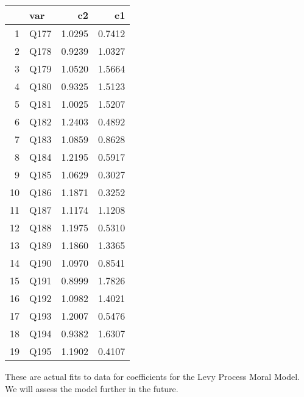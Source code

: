 \documentclass{amsart}
\begin{document}
\begin{table}[ht]
\centering
\begin{tabular}{rlrr}
  \hline
 & var & c2 & c1 \\ 
  \hline
1 & Q177 & 1.0295 & 0.7412 \\ 
  2 & Q178 & 0.9239 & 1.0327 \\ 
  3 & Q179 & 1.0520 & 1.5664 \\ 
  4 & Q180 & 0.9325 & 1.5123 \\ 
  5 & Q181 & 1.0025 & 1.5207 \\ 
  6 & Q182 & 1.2403 & 0.4892 \\ 
  7 & Q183 & 1.0859 & 0.8628 \\ 
  8 & Q184 & 1.2195 & 0.5917 \\ 
  9 & Q185 & 1.0629 & 0.3027 \\ 
  10 & Q186 & 1.1871 & 0.3252 \\ 
  11 & Q187 & 1.1174 & 1.1208 \\ 
  12 & Q188 & 1.1975 & 0.5310 \\ 
  13 & Q189 & 1.1860 & 1.3365 \\ 
  14 & Q190 & 1.0970 & 0.8541 \\ 
  15 & Q191 & 0.8999 & 1.7826 \\ 
  16 & Q192 & 1.0982 & 1.4021 \\ 
  17 & Q193 & 1.2007 & 0.5476 \\ 
  18 & Q194 & 0.9382 & 1.6307 \\ 
  19 & Q195 & 1.1902 & 0.4107 \\ 
   \hline
\end{tabular}
\end{table}

These are actual fits to data for coefficients for the Levy Process Moral Model.  We will assess the model further in the future.
\end{document}
